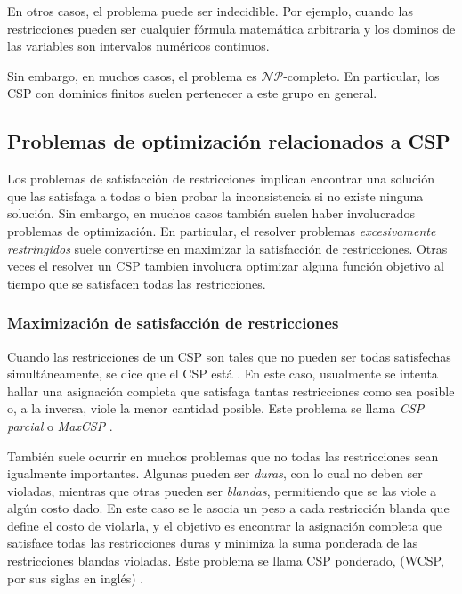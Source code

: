 \documentclass{llncs}
\begin{document}
   	En otros casos, el problema puede ser indecidible. Por ejemplo, cuando las restricciones pueden ser cualquier fórmula matemática arbitraria y los dominos de las variables son intervalos numéricos continuos.
   	
   	Sin embargo, en muchos casos, el problema es $\mathcal{NP}$-completo. En particular, los CSP con dominios finitos suelen pertenecer a este grupo en general.
   	
   	\subsection{Problemas de optimización relacionados a CSP}
   	\label{subsec:cspOptimization}
   	Los problemas de satisfacción de restricciones implican encontrar una solución que las
   	satisfaga a todas o bien probar la inconsistencia si no existe ninguna solución. Sin embargo,
   	en muchos casos también suelen haber involucrados problemas de optimización. En particular,
   	el resolver problemas \textit{excesivamente restringidos} suele convertirse en maximizar la
   	satisfacción de restricciones. Otras veces el resolver un CSP tambien involucra optimizar
   	alguna función objetivo al tiempo que se satisfacen todas las restricciones.
   	
   	\subsubsection{Maximización de satisfacción de restricciones}
   	Cuando las restricciones de un CSP son tales que no pueden ser todas satisfechas simultáneamente, se dice que el CSP está . En este caso,
   	usualmente se intenta hallar una asignación completa que satisfaga tantas restricciones como sea posible o, a la inversa, viole la menor cantidad posible. Este problema se llama \textit{CSP parcial} o \textit{MaxCSP} \cite{fre:wal}.

	También suele ocurrir en muchos problemas que no todas las restricciones sean igualmente
	importantes. Algunas pueden ser \textit{duras}, con lo cual no deben ser violadas, mientras
	que otras pueden ser \textit{blandas}, permitiendo que se las viole a algún costo dado. En este caso se le asocia un peso a cada restricción blanda que define el costo de violarla, y el objetivo es encontrar la asignación completa que satisface todas las restricciones duras y minimiza la suma ponderada de las restricciones blandas violadas. Este problema se llama CSP ponderado, (WCSP, por sus siglas en inglés) \cite{shi:far:ver}.
	
\end{document}
